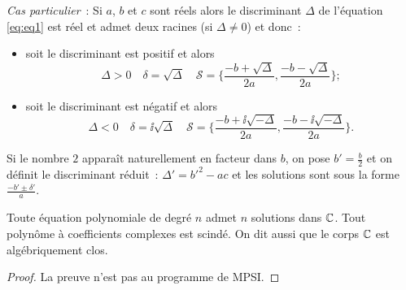                             \emph{Cas particulier}~: Si \(a\), \(b\) et \(c\) sont réels alors le 
                            discriminant \(\Delta\) de l'équation \eqref{eq:eq1} est réel et admet deux 
                            racines (si \(\Delta \neq 0\)) et donc~:
                            \begin{itemize}
                              \item soit le discriminant est positif et alors
                                \begin{equation}
                                  \Delta >0 \quad \delta = \sqrt{\Delta} \quad \mathcal{S} = 
                                  \biggl\lbrace \frac{-b + \sqrt{\Delta}}{2a} , 
                                    \frac{-b-\sqrt{\Delta}}{2a} \biggl\rbrace;
                                  \end{equation}
                                \item soit le discriminant est négatif et alors
                                  \begin{equation}
                                    \Delta <0 \quad \delta = \ii\sqrt{\Delta} \quad \mathcal{S} = 
                                    \biggl\lbrace \frac{-b + \ii\sqrt{-\Delta}}{2a} , 
                                      \frac{-b-\ii\sqrt{-\Delta}}{2a} \biggl\rbrace.
                                    \end{equation}
                                \end{itemize}

                                Si le nombre \(2\) apparaît naturellement en facteur dans \(b\), on pose 
                                \(b' = \frac{b}{2}\) et on définit le discriminant réduit~: \(\Delta' = 
                                b'^2-ac\) et les solutions sont sous la forme \(\frac{-b'\pm \delta'}{a}\).

                                \begin{theo}
                                  Toute équation polynomiale de degré \(n\) admet \(n\) solutions dans \(\mathbb{C}\).  
                                  Tout polynôme à coefficients complexes est scindé. On dit aussi que le corps 
                                  \(\mathbb{C}\) est algébriquement clos.
                                \end{theo}

                                \begin{proof}
                                  La preuve n'est pas au programme de MPSI.
                                \end{proof}

